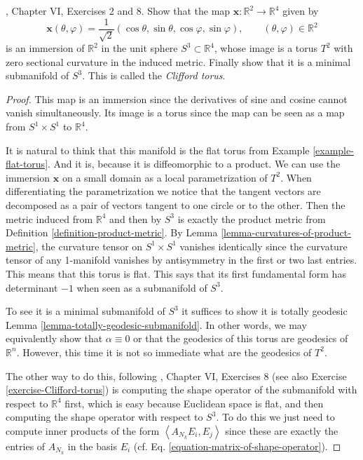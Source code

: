 \begin{exercise}
\label{exercise-Clifford-torus}
\cite{doc}, Chapter VI, Exercises 2 and 8.
Show that the map
$\mathbf{x}:\mathbb{R}^2\to\mathbb{R}^4$
given by
$$
\mathbf{x}(\theta,\varphi)
=\frac{1}{\sqrt{2}}(\cos\theta,\sin\theta,
\cos\varphi,\sin\varphi),
\qquad(\theta,\varphi)\in\mathbb{R}^2
$$
is an immersion of $\mathbb{R}^2$ in the unit
sphere $S^3\subset\mathbb{R}^4$,
whose image is a torus $T^2$ with zero
sectional curvature in the induced
metric. Finally show that it is a minimal
submanifold of $S^3$. This is called
the {\it Clifford torus}.
\end{exercise}

\begin{proof}
This map is an immersion since the
derivatives of sine and cosine cannot vanish
simultaneously. Its image is a torus since
the map can be seen as a map
from $S^1\times S^1$ to $\mathbb{R}^4$.

It is natural to think that this manifold is
the flat torus from Example
\ref{example-flat-torus}. And it is, because
it is diffeomorphic to a product.
We can use the immersion $\mathbf{x}$ on a
small domain as a local
parametrization of $T^2$.  When
differentiating the parametrization we notice
that the tangent vectors are decomposed as a
pair of vectors tangent to one
circle or to the other. Then the metric
induced from $\mathbb{R}^4$ and then by
$S^3$ is exactly the product metric from
Definition
\ref{definition-product-metric}. By Lemma
\ref{lemma-curvatures-of-product-metric}, the
curvature tensor on $S^1\times
S^1$ vanishes identically since the curvature
tensor of any 1-manifold vanishes
by antisymmetry in the first or two last
entries. This means that this torus is
flat. This says that its first fundamental
form has determinant $-1$ when seen
as a submanifold of $S^3$.

To see it is a minimal submanifold of $S^3$
it suffices to show it is totally
geodesic Lemma
\ref{lemma-totally-geodesic-submanifold}. In
other words, we may
equivalently show that $\alpha\equiv0$ or
that the geodesics of this torus are
geodesics of $\mathbb{R}^n$. However, this
time it is not so immediate what are
the geodesics of $T^2$.

The other way to do this, following
\cite{doc}, Chapter VI, Exercises 8 (see also
Exercise \ref{exercise-Clifford-torus}) is
computing the shape operator of the
submanifold with respect to $\mathbb{R}^4$
first, which is easy because
Euclidean space is flat, and then computing
the shape operator with respect to
$S^3$. To do this we just need to compute
inner products of the form
$\left\langle{}A_{N_k}E_i,E_j\right\rangle{}$ since these are
exactly the entries of $A_{N_k}$
in the basis $E_i$ (cf. Eq.
\ref{equation-matrix-of-shape-operator}).


\end{proof}
